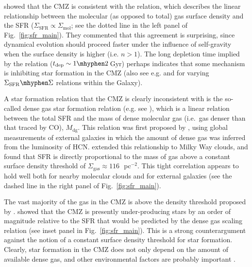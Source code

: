 \citet{Kruijssen2014a} showed that the CMZ is consistent with the \citet{Bigiel2008} relation, which describes the linear relationship between the molecular (as opposed to total) gas surface density and the SFR ($\Sigma_\mathrm{SFR}\propto\Sigma_\mathrm{mol}$; see the dotted line in the left panel of Fig.~\ref{fig:sfr_main}).
They commented that this agreement is surprising, since dynamical evolution should proceed faster under the influence of self-gravity when the surface density is higher (i.e. $n>1$). The long depletion time implied by the \cite{Bigiel2008} relation ($t_\mathrm{dep}\sim1\mhyphen2$\,Gyr) perhaps indicates that some mechanism is inhibiting star formation in the CMZ (also see e.g. \citealp{Sofue2017b} and \citealp{Sofue2017c} for varying $\Sigma_\mathrm{SFR}\mhyphen\Sigma$ relations within the Galaxy). 

A star formation relation that the CMZ is clearly inconsistent with is the so-called dense gas star formation relation (e.g. see \citealp{Longmore2013b}), which is a linear relation between the total SFR and the mass of dense molecular gas (i.e.\ gas denser than that traced by CO), $M_\mathrm{dg}$. This relation was first proposed by \citet{Gao2004}, using global measurements of external galaxies in which the amount of dense gas was inferred from the luminosity of HCN. \citet{Lada2010,Lada2012} extended this relationship to Milky Way clouds, and found that SFR is directly proportional to the mass of gas above a constant surface density threshold of $\Sigma_\mathrm{gas} \approx 116$\,\msun~pc$^{-2}$. This tight correlation appears to hold well both for nearby molecular clouds and for external galaxies (see the dashed line in the right panel of Fig.~\ref{fig:sfr_main}). 

The vast majority of the gas in the CMZ is above the density threshold proposed by 
\citet{Lada2010,Lada2012}. \citet{Longmore2013b} showed that the CMZ is presently under-producing stars by an order of magnitude relative to the SFR that would be predicted by the dense gas scaling relation (see inset panel in Fig.~\ref{fig:sfr_main}).
This is a strong counterargument against the notion of a constant surface density threshold for star formation. 
Clearly, star formation in the CMZ does not only depend on the amount of available dense gas, and other environmental factors are probably important \citep[][we will return to this topic in the context of individual clouds in \S\ref{sec:sfthreshold}]{Longmore2013b, Kruijssen2014a, Rathborne2014a, Ginsburg2018a}.

